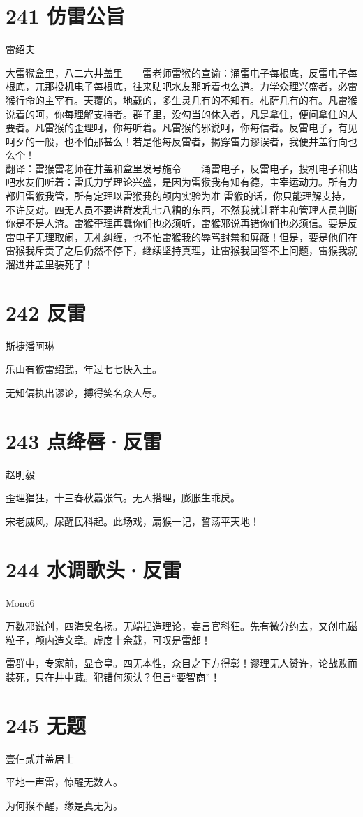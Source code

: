 \documentclass[UTF8,12pt,oneside]{ctexbook}
\def\pau#1{\begin{center} {#1} \end{center}} %
\def\pst#1{\begin{center}\Large \kaishu {#1} \songti \large \end{center}}%
\def\poem#1#2{\section{#1}\pau{#2}} %
\def\poemwithst#1#2#3{\section{#1}\pst{#2}\pau{#3}} %
\begin{document}
        \poem{241 仿雷公旨}{雷绍夫}

        大雷猴盒里，八二六井盖里\ \ \ \ 雷老师雷猴的宣谕：涌雷电子每根底，反雷电子每根底，兀那投机电子每根底，往来贴吧水友那听着也么道。力学众理兴盛者，必雷猴行命的主宰有。天覆的，地载的，多生灵几有的不知有。札萨几有的有。凡雷猴说着的呵，你每理解支持者。群子里，没勾当的休入者，凡是拿住，便问拿住的人要者。凡雷猴的歪理呵，你每听着。凡雷猴的邪说呵，你每信者。反雷电子，有见呵歹的一般，也不怕那甚么！若是他每反雷者，揭穿雷力谬误者，我便井盖行向也么个！ 
        ~\\
        
        \kaishu
        翻译：雷猴雷老师在井盖和盒里发号施令\ \ \ \ 涌雷电子，反雷电子，投机电子和贴吧水友们听着：雷氏力学理论兴盛，是因为雷猴我有知有德，主宰运动力。所有力都归雷猴我管，所有定理以雷猴我的颅内实验为准 雷猴的话，你只能理解支持，不许反对。四无人员不要进群发乱七八糟的东西，不然我就让群主和管理人员判断你是不是人渣。雷猴歪理再蠢你们也必须听，雷猴邪说再错你们也必须信。要是反雷电子无理取闹，无礼纠缠，也不怕雷猴我的辱骂封禁和屏蔽！但是，要是他们在雷猴我斥责了之后仍然不停下，继续坚持真理，让雷猴我回答不上问题，雷猴我就溜进井盖里装死了！
        \songti

        \newpage

        \poem{242 反雷}{斯捷潘阿琳}

        \begin{center}
        乐山有猴雷绍武，年过七七快入土。
        
        无知偏执出谬论，搏得笑名众人辱。
        \end{center}

        \poem{243 点绛唇·反雷}{赵明毅}

        歪理猖狂，十三春秋嚣张气。无人搭理，膨胀生乖戾。
        
        宋老威风，尿醒民科起。此场戏，扇猴一记，誓荡平天地！

        \poemwithst{244 水调歌头·反雷}{改氢氦锂铍硼咏雷}{Mono6}

        万数邪说创，四海臭名扬。无端捏造理论，妄言官科狂。先有微分约去，又创电磁粒子，颅内造文章。虚度十余载，可叹是雷郎！ 

        雷群中，专家前，显仓皇。四无本性，众目之下方得彰！谬理无人赞许，论战败而装死，只在井中藏。犯错何须认？但言“要智商”！

        \newpage

        \poem{245 无题}{壹仨贰井盖居士}
        \begin{center}
        平地一声雷，惊醒无数人。

        为何猴不醒，缘是真无为。
        \end{center}
\end{document}
